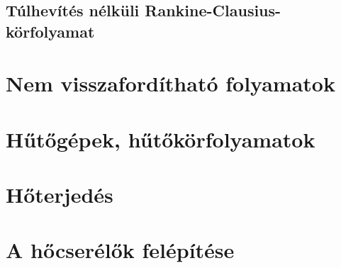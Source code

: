 \documentclass[11pt, a4paper]{report}
\begin{document}


\section*{Túlhevítés nélküli Rankine-Clausius-körfolyamat}






\chapter{Nem visszafordítható folyamatok}







\chapter{Hűtőgépek, hűtőkörfolyamatok}






\chapter{Hőterjedés}









\chapter{A hőcserélők felépítése}








\end{document}
